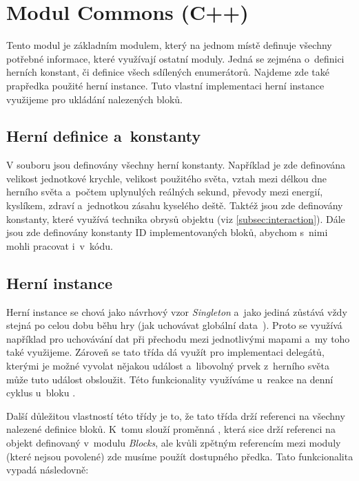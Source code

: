 
\section{Modul Commons (C++)}

Tento modul je základním modulem, který na jednom místě definuje všechny potřebné informace, které využívají ostatní moduly. Jedná se zejména o~definici herních konstant, či definice všech sdílených enumerátorů. Najdeme zde také prapředka použité herní instance. Tuto vlastní implementaci herní instance využijeme pro ukládání nalezených bloků.

\subsection{Herní definice a~konstanty}



V souboru  jsou definovány všechny herní konstanty. Například je zde definována velikost jednotkové krychle, velikost použitého světa, vztah mezi délkou dne herního světa a~počtem uplynulých reálných sekund, převody mezi energií, kyslíkem, zdraví a~jednotkou zásahu kyselého deště. Taktéž jsou zde definovány konstanty, které využívá technika obrysů objektu (viz \ref{subsec:interaction}). Dále jsou zde definovány konstanty ID implementovaných bloků, abychom s~nimi mohli pracovat i~v~kódu.

\subsection{Herní instance}

Herní instance  se chová jako návrhový vzor \textit{Singleton} a~jako jediná zůstává vždy stejná po celou dobu běhu hry (jak uchovávat globální data~\citep{ue_gameInstance}). Proto se využívá například pro uchovávání dat při přechodu mezi jednotlivými mapami a~my toho také využijeme. Zároveň se tato třída dá využít pro implementaci delegátů, kterými je možné vyvolat nějakou událost a~libovolný prvek z~herního světa může tuto událost obsloužit. Této funkcionality využíváme u~reakce na denní cyklus u~bloku .

Další důležitou vlastností této třídy je to, že tato třída drží referenci na všechny nalezené definice bloků. K~tomu slouží proměnná , která sice drží referenci na objekt definovaný v~modulu \textit{Blocks}, ale kvůli zpětným referencím mezi moduly (které nejsou povolené) zde musíme použít dostupného předka. Tato funkcionalita vypadá následovně:

